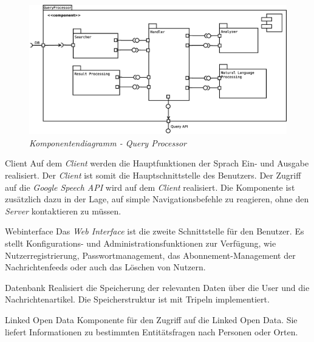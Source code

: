 \begin{figure}
\centering
\includegraphics[width=1\textheight, angle=90]{Systementwurf/05_implementierungsentwurf/paket-queryprocessor}
\caption{\textit{\NewsGenie Komponentendiagramm - Query Processor}}
\label{fig:Komponenten_QP}
\end{figure}

\begin{component}{10}{Client}
Auf dem \textit{Client} werden die Hauptfunktionen der Sprach Ein- und Ausgabe realisiert. Der \textit{Client} ist somit die Hauptschnittstelle des Benutzers. Der Zugriff auf die \textit{Google Speech API} wird auf dem \textit{Client} realisiert. 
Die Komponente ist zusätzlich dazu in der Lage, auf simple Navigationsbefehle zu reagieren, ohne den \textit{Server} 
kontaktieren zu müssen.
\end{component}

\begin{component}{20}{Webinterface}
Das \textit{Web Interface} ist die zweite Schnittstelle für den Benutzer. Es stellt Konfigurations- und 
Administrationsfunktionen zur Verfügung, wie Nutzerregistrierung, Passwortmanagement, das Abonnement-Management
der Nachrichtenfeeds oder auch das Löschen von Nutzern.
\end{component}

\begin{component}{30}{Datenbank}
Realisiert die Speicherung der relevanten Daten über die User und die Nachrichtenartikel.
Die Speicherstruktur ist mit Tripeln implementiert.
\end{component}

\begin{component}{35}{Linked Open Data}
Komponente für den Zugriff auf die Linked Open Data. Sie liefert Informationen zu bestimmten
Entitätsfragen nach Personen oder Orten.
\end{component}

